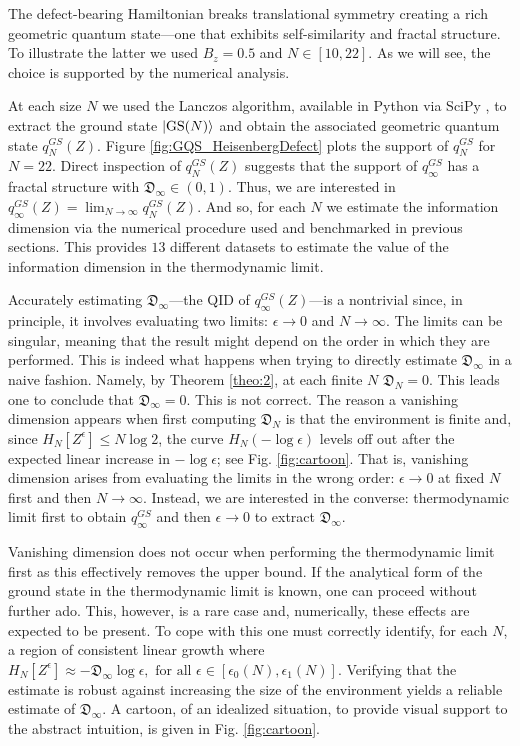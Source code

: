 \documentclass[draft,nofootinbib,pre,twocolumn,showkeys,superscriptaddress,preprintnumbers,floatfix]{revtex4-1}
\newcommand{\1}{\mathbbm{1}}
\newcommand{\DD}{\mathfrak{D}}
\begin{document}
The defect-bearing Hamiltonian breaks translational symmetry creating a rich
geometric quantum state---one that exhibits self-similarity and fractal
structure. To illustrate the latter we used $B_z = 0.5$ and $N \in [10,22]$.
As we will see, the choice is supported by the numerical analysis.

At each size $N$ we used the Lanczos algorithm, available in Python via SciPy
\cite{2020SciPy}, to extract the ground state $\ket{\mathrm{GS}(N)}$ and obtain
the associated geometric quantum state $q^{GS}_{N}(Z)$. Figure
\ref{fig:GQS_HeisenbergDefect} plots the support of $q^{GS}_N$ for $N=22$.
Direct inspection of $q_{N}^{GS}(Z)$ suggests that the support of
$q_{\infty}^{GS}$ has a fractal structure with $\DD_{\infty} \in (0,1)$. Thus,
we are interested in $q^{GS}_{\infty}(Z)= \lim_{N\to \infty} q_N^{GS}(Z)$. And
so, for each $N$ we estimate the information dimension via the numerical
procedure used and benchmarked in previous sections. This provides $13$
different datasets to estimate the value of the information dimension in the
thermodynamic limit.

Accurately estimating $\DD_{\infty}$---the QID of $q^{GS}_{\infty}(Z)$---is a
nontrivial since, in principle, it involves evaluating two limits: $\epsilon
\to 0$ and $N \to \infty$. The limits can be singular, meaning that the result
might depend on the order in which they are performed. This is indeed what
happens when trying to directly estimate $\DD_{\infty}$ in a naive fashion.
Namely, by Theorem \ref{theo:2}, at each finite $N$ $\DD_N=0$. This leads one
to conclude that $\DD_{\infty}=0$. This is not correct. The reason a vanishing
dimension appears when first computing $\DD_N$ is that the environment is
finite and, since $H_N[Z^\epsilon]\leq N\log 2$, the curve $H_N(-\log
\epsilon)$ levels off out after the expected linear increase in $-\log
\epsilon$; see Fig. \ref{fig:cartoon}. That is, vanishing dimension arises from
evaluating the limits in the wrong order: $\epsilon \to 0$ at fixed $N$ first
and then $N \to \infty$. Instead, we are interested in the converse:
thermodynamic limit first to obtain $q_{\infty}^{GS}$ and then $\epsilon \to 0$
to extract $\DD_{\infty}$.

Vanishing dimension does not occur when performing the thermodynamic limit
first as this effectively removes the upper bound. If the analytical form of the
ground state in the thermodynamic limit is known, one can proceed without
further ado. This, however, is a rare case and, numerically, these effects are
expected to be present. To cope with this one must correctly identify, for each
$N$, a region of consistent linear growth where $H_N[Z^\epsilon] \approx
-\DD_{\infty} \log \epsilon, \text{~for~all~} \epsilon \in
[\epsilon_{0}(N),\epsilon_1(N)]$. Verifying that the estimate is robust against
increasing the size of the environment yields a reliable estimate of
$\DD_{\infty}$.  A cartoon, of an idealized situation, to provide visual
support to the abstract intuition, is given in Fig. \ref{fig:cartoon}. 
\end{document}
